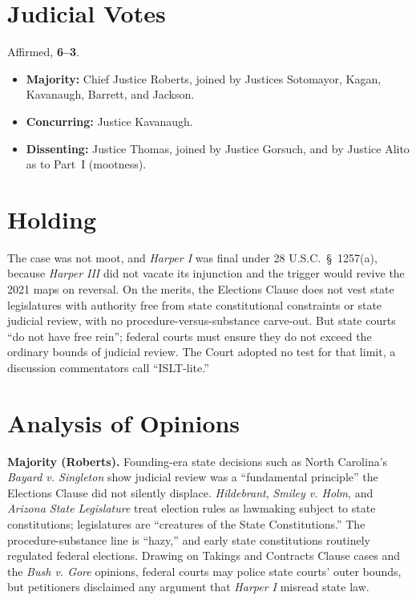 \documentclass[12pt]{article}
\begin{document}
\section{Judicial Votes}

Affirmed, \textbf{6--3}.
\begin{itemize}
\item \textbf{Majority:} Chief Justice Roberts, joined by Justices Sotomayor, Kagan, Kavanaugh, Barrett, and Jackson.
\item \textbf{Concurring:} Justice Kavanaugh.
\item \textbf{Dissenting:} Justice Thomas, joined by Justice Gorsuch, and by Justice Alito as to Part~I (mootness).
\end{itemize}

\section{Holding}

The case was not moot, and \textit{Harper I} was final under 28 U.S.C.\ \S~1257(a), because \textit{Harper III} did not vacate its injunction and the trigger would revive the 2021 maps on reversal. On the merits, the Elections Clause does not vest state legislatures with authority free from state constitutional constraints or state judicial review, with no procedure-versus-substance carve-out. But state courts ``do not have free rein''; federal courts must ensure they do not exceed the ordinary bounds of judicial review. The Court adopted no test for that limit, a discussion commentators call ``ISLT-lite.''

\section{Analysis of Opinions}

\textbf{Majority (Roberts).} Founding-era state decisions such as North Carolina's \textit{Bayard v. Singleton} show judicial review was a ``fundamental principle'' the Elections Clause did not silently displace. \textit{Hildebrant}, \textit{Smiley v. Holm}, and \textit{Arizona State Legislature} treat election rules as lawmaking subject to state constitutions; legislatures are ``creatures of the State Constitutions.'' The procedure-substance line is ``hazy,'' and early state constitutions routinely regulated federal elections. Drawing on Takings and Contracts Clause cases and the \textit{Bush v. Gore} opinions, federal courts may police state courts' outer bounds, but petitioners disclaimed any argument that \textit{Harper I} misread state law.
\end{document}
